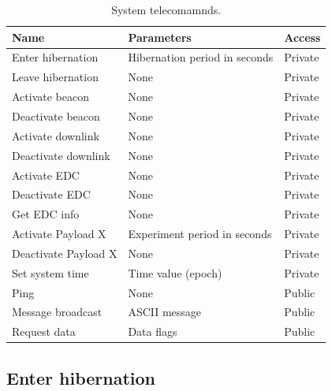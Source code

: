 \begin{table}[!h]
    \centering
    \begin{tabular}{lll}
        \toprule[1.5pt]
        \textbf{Name}          & \textbf{Parameters}           & \textbf{Access} \\
        \midrule
        Enter hibernation      & Hibernation period in seconds & Private         \\
        Leave hibernation      & None                          & Private         \\
        Activate beacon        & None                          & Private         \\
        Deactivate beacon      & None                          & Private         \\
        Activate downlink      & None                          & Private         \\
        Deactivate downlink    & None                          & Private         \\
        Activate EDC           & None                          & Private         \\
        Deactivate EDC         & None                          & Private         \\
        Get EDC info           & None                          & Private         \\
        Activate Payload X     & Experiment period in seconds  & Private         \\
        Deactivate Payload X   & None                          & Private         \\
        Set system time        & Time value (epoch)            & Private         \\
        Ping                   & None                          & Public          \\
        Message broadcast      & ASCII message                 & Public          \\
        Request data           & Data flags                    & Public          \\
        \bottomrule[1.5pt]
    \end{tabular}
    \caption{System telecomamnds.}
    \label{tab:system-telecommands}
\end{table}

\subsection{Enter hibernation}

